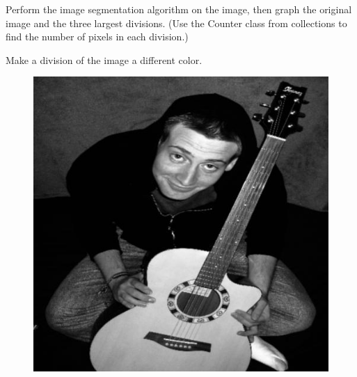 \begin{problem}
Perform the image segmentation algorithm on the image, then graph the original image and the three largest divisions.
(Use the Counter class from collections to find the number of pixels in each division.)
\end{problem}

\begin{problem}
Make a division of the image a different color.
\end{problem}


\vfill
\begin{figure}[ht]
\begin{minipage}[b]{0.47\linewidth}
\centering
\includegraphics[width=\textwidth]{MSTseg1.jpg}
\end{minipage}
\hspace{0.5cm}
\begin{minipage}[b]{0.47\linewidth}
\centering

\end{minipage}
\end{figure}
